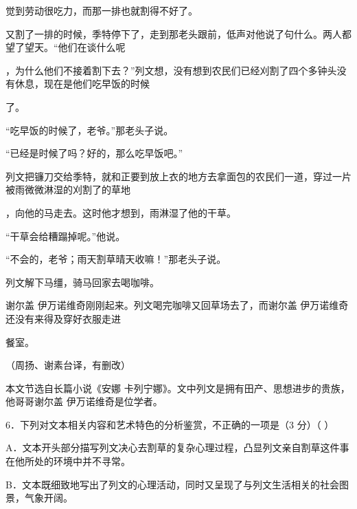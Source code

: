 \documentclass[UTF8,a4paper,fontset=fandol]{ctexart}
\begin{document}
觉到劳动很吃力，而那一排也就割得不好了。\par
\hspace*{1.8em}又割了一排的时候，季特停下了，走到那老头跟前，低声对他说了句什么。两人都望了望天。“他们在谈什么呢\par
，为什么他们不接着割下去？”列文想，没有想到农民们已经刈割了四个多钟头没有休息，现在是他们吃早饭的时候\par
了。\par
\hspace*{1.8em}“吃早饭的时候了，老爷。”那老头子说。\par
\hspace*{1.8em}“已经是时候了吗？好的，那么吃早饭吧。”\par
\hspace*{1.8em}列文把镰刀交给季特，就和正要到放上衣的地方去拿面包的农民们一道，穿过一片被雨微微淋湿的刈割了的草地\par
，向他的马走去。这时他才想到，雨淋湿了他的干草。\par
\hspace*{1.8em}“干草会给糟蹋掉呢。”他说。\par
\hspace*{1.8em}“不会的，老爷；雨天割草晴天收嘛！”那老头子说。\par
\hspace*{1.8em}列文解下马缰，骑马回家去喝咖啡。\par
\hspace*{1.8em}谢尔盖 伊万诺维奇刚刚起来。列文喝完咖啡又回草场去了，而谢尔盖                                  伊万诺维奇还没有来得及穿好衣服走进\par
餐室。\par
\hspace*{1.8em}（周扬、谢素台译，有删改）\par
\vspace{0.35em}\par
[注] 本文节选自长篇小说《安娜           卡列宁娜》。文中列文是拥有田产、思想进步的贵族，他哥哥谢尔盖                        伊万诺维奇是位学者。\par
\vspace{0.35em}\par
6．下列对文本相关内容和艺术特色的分析鉴赏，不正确的一项是（3 分）（ ）\par
A．文本开头部分描写列文决心去割草的复杂心理过程，凸显列文亲自割草这件事在他所处的环境中并不寻常。\par
B．文本既细致地写出了列文的心理活动，同时又呈现了与列文生活相关的社会图景，气象开阔。\par
\end{document}
